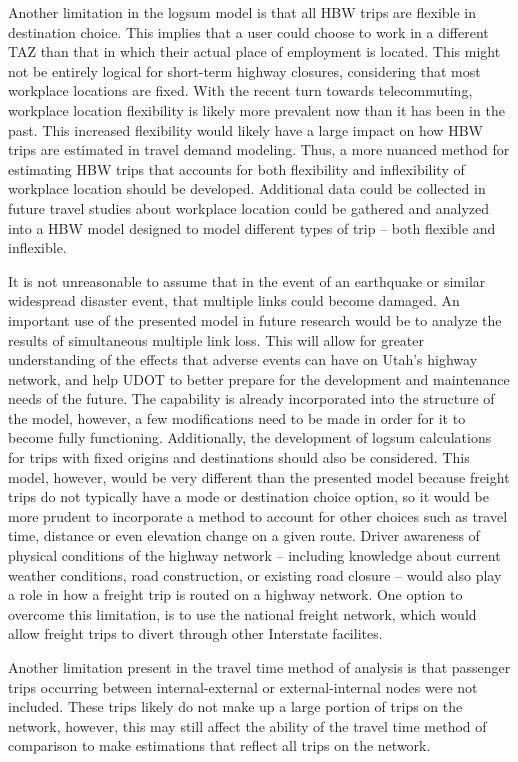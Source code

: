 Another limitation in the logsum model is that all HBW trips are flexible in
destination choice. This implies that a user could choose to work in a different
TAZ than that in which their actual place of employment is located.
This might not be entirely logical for short-term highway closures, considering that
most workplace locations are fixed. With the recent turn towards telecommuting,
workplace location flexibility is likely more prevalent now than it has been in
the past. This increased flexibility would likely have a large impact on how HBW
trips are estimated in travel demand modeling. Thus, a more nuanced method for estimating
HBW trips that accounts
for both flexibility and inflexibility of workplace location should be developed.
Additional data could be collected in future travel
studies about workplace location could be gathered
and analyzed into a HBW model designed to model different types of trip -- both flexible and inflexible.

It is not unreasonable to assume that in the event of an earthquake or
similar widespread disaster event, that multiple links could become
damaged. An important use of the presented model in future research would be
to analyze the results of simultaneous multiple link
loss. This will allow for
greater understanding of the effects that adverse events can have on Utah’s
highway network, and help UDOT to better prepare for the development and
maintenance needs of the future. The capability
is already incorporated into the structure of the model, however, a few modifications
need to be made in order for it to become fully functioning.
Additionally, the development of logsum calculations for trips with fixed
origins and destinations should also be considered. This model, however,
would be very different than the presented model because freight trips
do not typically have a mode or destination choice option, so it would be
more prudent to incorporate a method to account for other choices such as travel time,
distance or even elevation change on a given route. Driver awareness of physical
conditions of the highway network -- including knowledge about current weather conditions,
road construction, or existing road closure -- would also play a role in how a freight trip
is routed on a highway network. One option to overcome this limitation, is to use the national
freight network, which would allow freight trips to divert through other Interstate
facilites.

Another limitation present in the travel time method of analysis is that passenger
trips occurring between internal-external or external-internal nodes were not
included. These trips likely do not make up a large portion of trips on the network,
however, this may still affect the ability of the travel time method of comparison
to make estimations that reflect all trips on the network.

